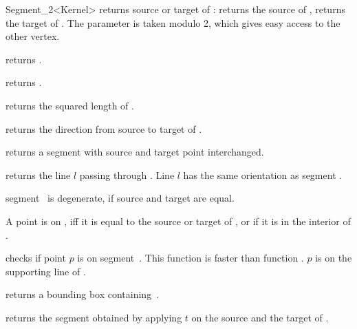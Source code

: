 \begin{ccRefClass} {Segment_2<Kernel>}
       {returns source or target   of \ccVar:    returns
        the source of \ccVar,  returns the target of \ccVar. 
        The parameter  is taken modulo 2, which gives 
        easy access to the other vertex. }

        {returns .}

       {returns .}

       {returns the squared length of \ccVar. }

       {returns the direction from source to target of \ccVar.}


       {returns a segment with source and target point interchanged.}

       {returns the line $l$ passing through \ccVar. Line $l$  has the
        same orientation as segment \ccVar.}

\ccPredicates

       {segment \ccVar\ is degenerate, if source and target are equal.}

       {}
\ccGlue
{}
       {}

       {A point is on \ccVar, iff it is equal to the source or target 
        of \ccVar, or if it is in the interior of \ccVar.}

       {checks if point $p$ is on segment~\ccVar. This function is faster
        than function .
        \ccPrecond $p$ is on the supporting line of \ccVar.}


       {returns a bounding box containing~\ccVar.}

       {returns the segment obtained by applying $t$ on the source
        and the target of \ccVar.}

\ccSeeAlso
{}\\

\end{ccRefClass} 
